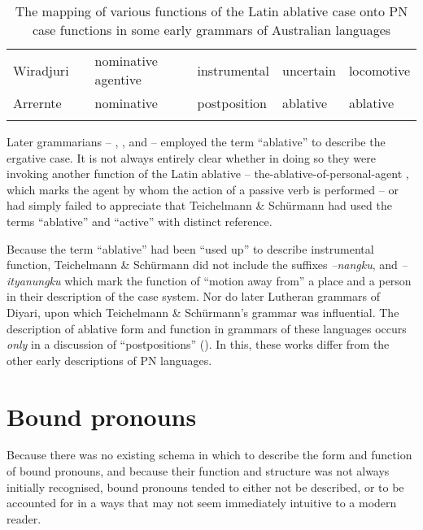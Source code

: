 \begin{sidewaystable}
\begin{tabularx}{\textwidth}{p{3.5cm}QQQQ}
\tablevspace
\mbox{Wiradjuri \citep{gunther_lecture_1840}   }          &  nominative agentive                & instrumental          &  {uncertain}              & locomotive\\
\tablevspace
Arrernte \citep{Kempe1891}                  &  nominative                         &   postposition        & ablative                  & ablative \\
\lspbottomrule
  \end{tabularx}
    \caption{\label{fig:5:89} The mapping of various functions of the Latin ablative case onto PN case functions
 in some early grammars of Australian languages}
    \label{tab:chap5:mapping}
\end{sidewaystable}


Later grammarians -- \citet{symmons_grammatical_1841}, \citet{meyer_vocabulary_1843}, and \citet{reuther_dieri_1894} -- employed the term “ablative” to describe the ergative case. It is not always entirely clear whether in doing so they were invoking another function of the Latin ablative -- the-ablative-of-personal-agent \citep[272]{gildersleeve_latin_1895}, which marks the agent by whom the action of a passive verb is performed -- or had simply failed to appreciate that Teichelmann \& Schürmann had used the terms “ablative” and “active” with distinct reference.

Because the term “ablative” had been “used up” to describe instrumental function, Teichelmann \& Schürmann did not include the suffixes \textit{–nangku}, and \textit{–ityanungku} which mark the function of “motion away from” a place and a person in their description of the case system. Nor do later Lutheran grammars of Diyari, upon which Teichelmann \& Schürmann’s grammar was influential. The description of ablative form and function in grammars of these languages occurs \textit{only} in a discussion of “postpositions” (). In this, these works differ from the other early descriptions of PN languages.


\section{Bound pronouns}
\label{sec:key:5.5}

Because there was no existing schema in which to describe the form and function of bound pronouns, and because their function and structure was not always initially recognised, bound pronouns tended to either not be described, or to be accounted for in a ways that may not seem immediately intuitive to a modern reader. 

